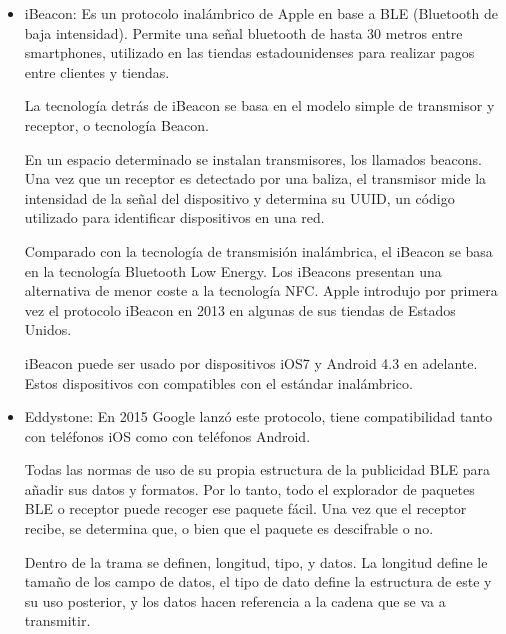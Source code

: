 \documentclass[conference,compsoc,onecolumn]{IEEEtran}
\begin{document}
 \begin{itemize}
 \item{iBeacon: }Es un protocolo inalámbrico de Apple en base a BLE (Bluetooth de baja intensidad). Permite una señal bluetooth de hasta 30 metros entre smartphones, utilizado en las tiendas estadounidenses para realizar pagos entre clientes y tiendas.
 
 \enskip
 
 La tecnología detrás de iBeacon se basa en el modelo simple de transmisor y receptor, o tecnología Beacon. 
 
  \enskip
  
  En un espacio determinado se instalan transmisores, los llamados beacons. Una vez que un receptor es detectado por una baliza, el transmisor mide la intensidad de la señal del dispositivo y determina su UUID, un código utilizado para identificar dispositivos en una red. 
  
  \enskip
  
  Comparado con la tecnología de transmisión inalámbrica, el iBeacon se basa en la tecnología Bluetooth Low Energy. Los iBeacons presentan una alternativa de menor coste a la tecnología NFC. Apple introdujo por primera vez el protocolo iBeacon en 2013 en algunas de sus tiendas de Estados Unidos.
  
  \enskip
  
  iBeacon puede ser usado por dispositivos iOS7 y Android 4.3 en adelante. Estos dispositivos con compatibles con el estándar inalámbrico.
  
  \enskip
 
 \item{Eddystone: }En 2015 Google lanzó este protocolo, tiene compatibilidad tanto con teléfonos iOS como con teléfonos Android.
 
 \enskip
 
 Todas las normas de uso de su propia estructura de la publicidad BLE para añadir sus datos y formatos. Por lo tanto, todo el explorador de paquetes BLE o receptor puede recoger ese paquete fácil. Una vez que el receptor recibe, se determina que, o bien que el paquete es descifrable o no.
 
 \enskip
 
 Dentro de la trama se definen, longitud, tipo, y datos. La longitud define le tamaño de los campo de datos, el tipo de dato define la estructura de este y su uso posterior, y los datos hacen referencia a la cadena que se va a transmitir.

 \end{itemize}
 
\end{document}
